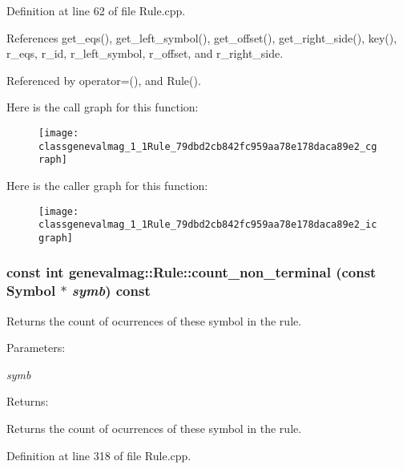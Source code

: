 Definition at line 62 of file Rule.cpp.

References get\_\-eqs(), get\_\-left\_\-symbol(), get\_\-offset(), get\_\-right\_\-side(), key(), r\_\-eqs, r\_\-id, r\_\-left\_\-symbol, r\_\-offset, and r\_\-right\_\-side.

Referenced by operator=(), and Rule().

Here is the call graph for this function:\nopagebreak
\begin{figure}[H]
\begin{center}
\leavevmode
\texttt{[image: classgenevalmag\_1\_1Rule\_79dbd2cb842fc959aa78e178daca89e2\_cgraph]}
\end{center}
\end{figure}


Here is the caller graph for this function:\nopagebreak
\begin{figure}[H]
\begin{center}
\leavevmode
\texttt{[image: classgenevalmag\_1\_1Rule\_79dbd2cb842fc959aa78e178daca89e2\_icgraph]}
\end{center}
\end{figure}
\hypertarget{classgenevalmag_1_1Rule_39eaafed8e0b506686d83175329c1085}{
\subsubsection[{count\_\-non\_\-terminal}]{\setlength{\rightskip}{0pt plus 5cm}const int genevalmag::Rule::count\_\-non\_\-terminal (const {\bf Symbol} $\ast$ {\em symb}) const}}
\label{classgenevalmag_1_1Rule_39eaafed8e0b506686d83175329c1085}


Returns the count of ocurrences of these symbol in the rule. \begin{Desc}
\item[Parameters:]
\begin{description}
\item[{\em symb}]\end{description}
\end{Desc}
\begin{Desc}
\item[Returns:]\end{Desc}
Returns the count of ocurrences of these symbol in the rule. 

Definition at line 318 of file Rule.cpp.

